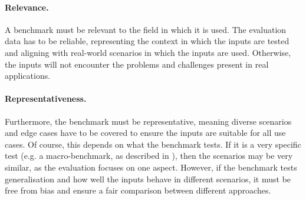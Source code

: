 \paragraph{Relevance.}
A benchmark must be relevant to the field in which it is used. The evaluation data has to be reliable, representing the context in which the inputs are tested and aligning with real-world scenarios in which the inputs are used. Otherwise, the inputs will not encounter the problems and challenges present in real applications. 

\paragraph{Representativeness.}
Furthermore, the benchmark must be representative, meaning diverse scenarios and edge cases have to be covered to ensure the inputs are suitable for all use cases. Of course, this depends on what the benchmark tests. If it is a very specific test (e.g. a macro-benchmark, as described in \cite{ml_benchmark_design}), then the scenarios may be very similar, as the evaluation focuses on one aspect. However, if the benchmark tests generalisation and how well the inputs behave in different scenarios, it must be free from bias and ensure a fair comparison between different approaches.